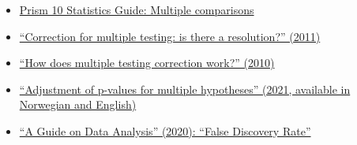 \documentclass[letterpaper, 12pt]{article}
\begin{document}
\begin{itemize}
    \setlength\itemsep{-0.5em}
     \item \href{https://www.graphpad.com/guides/prism/latest/statistics/stat_multiple_comparisons2.htm}{Prism 10 Statistics Guide: Multiple comparisons}
    \item \href{https://doi.org/10.1378/chest.11-0523}{``Correction for multiple testing: is there a resolution?'' (2011)}
    \item \href{https://doi.org/10.1038/nbt1209-1135}{``How does multiple testing correction work?'' (2010)}
    \item \href{https://doi.org/10.4045/tidsskr.21.0357}{``Adjustment of p-values for multiple hypotheses'' (2021, available in Norwegian and English)}
    \item \href{https://bookdown.org/mike/data_analysis/sec-false-discovery-rate.html}{``A Guide on Data Analysis'' (2020): ``False Discovery Rate''}
\end{itemize}
\end{document}
